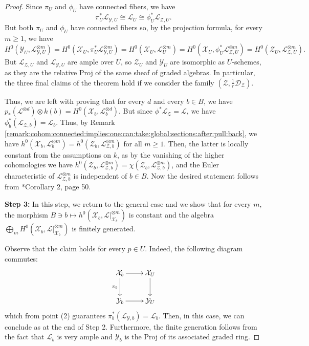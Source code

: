 \documentclass{amsart}
\newcommand{\cD}{\mathcal{D}}
\newcommand{\cL}{\mathcal{L}}
\newcommand{\cX}{\mathcal{X}}
\newcommand{\cY}{\mathcal{Y}}
\newcommand{\cZ}{\mathcal{Z}}
\theoremstyle{definition}
\def\subs#1.{_{#1}}
\begin{document}
\begin{proof}
Since $\pi_U$ and $\phi_U$ have connected fibers, we have
\[
\pi_U^*\cL_{\cY,U} \cong \cL_U \cong \phi^*_U\cL_{\cZ,U}.
\]
But both $\pi_U$ and $\phi_U$ have connected fibers so, by the projection formula, for every $m \geq 1$, we have
\[
H^0(\cY_U,\cL_{\cY,U}^{\otimes m}) = H^0(\cX_U,\pi^*_U\cL_{\cY,U}^{\otimes m}) =H^0(\cX_U,\cL_{U}^{\otimes m}) = H^0(\cX_U,\phi^*_U\cL_{\cZ,U}^{\otimes m})  =  H^0(\cZ_U,\cL_{\cZ,U}^{\otimes m}).
\]
But $\cL_{\cZ,U}$ and $\cL_{\cY,U}$ are ample over $U$, so $\cZ_U$ and $\cY_U$ are isomorphic as $U$-schemes, as they are the relative Proj of the same sheaf of graded algebras.
In particular, the three final claims of the theorem hold if we consider the family $(\cZ,\frac{1}{r}\cD_\cZ)$.

Thus, we are left with proving that for every $d$ and every $b\in B$, we have $p_*(\cL^{\otimes d})\otimes k(b) = H^0(\cX_b, \cL^{\otimes d}_b) $.
But since $\phi^*\cL_\cZ = \cL$, we have $\phi_b^*(\cL_{\cZ,b}) = \cL_{b}$.
Thus, by Remark \ref{remark:cohom:connected:implies:one:can:take:global:sections:after:pull:back}, we have $h^0(\cX_b,\cL _b^{\otimes m}) = h^0(\cZ_b,\cL \subs \cZ,b.^{\otimes m})$ for all $m \geq 1$.
Then, the latter is locally constant from the assumptions on $k$, as by the vanishing of the higher cohomologies we have $h^0(\cZ_b,\cL \subs \cZ,b.^{\otimes m})= \chi(\cZ_b,\cL \subs \cZ,b.^{\otimes m})$, and the Euler characteristic of $\cL \subs \cZ,b.^{\otimes m}$ is independent of $b \in B$. Now the desired statement follows from \cite{Mum74}*{Corollary 2, page 50}.

{\bf Step 3:} In this step, we return to the general case and we show that for every $m$, the morphism $B\ni b\mapsto h^0(\cX_b,\cL|_{\cX_b}^{\otimes m})$ is constant and the algebra $\bigoplus_m H^0(\cX_b,\cL|_{\cX_b}^{\otimes m})$ is finitely generated.


Observe that the claim holds for every $p\in U$. Indeed, the following diagram commutes:
$$\xymatrix{\cX_b \ar[r] \ar[d]_{\pi_b} & \cX_U \ar[d] \\ \cY_b \ar[r] & \cY_U}$$
which from point (2) guarantees $\pi_b^*(\cL_{\cY,b}) = \cL_{b}$.
Then, in this case, we can conclude as at the end of Step 2.
Furthermore, the finite generation follows from the fact that $\cL_{b}$ is very ample and $\cY_b$ is the Proj of its associated graded ring.


\end{proof}
\end{document}
